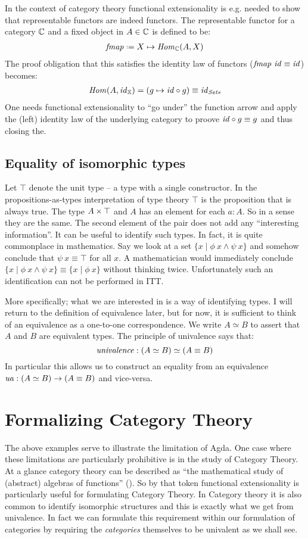 In the context of category theory functional extensionality is e.g. needed to
show that representable functors are indeed functors. The representable functor
for a category $\mathbb{C}$ and a fixed object in $A \in \mathbb{C}$ is defined to be:
%
\begin{align*}
\fmap \defeq X \mapsto \Hom_{\bC}(A, X)
\end{align*}
%
The proof obligation that this satisfies the identity law of functors
($\mathit{fmap}\ \mathit{id} \equiv \mathit{id}$) becomes:
%
\begin{align*}
\mathit{Hom}(A, \mathit{id}_{\mathbb{X}}) = (g \mapsto \mathit{id} \circ g) \equiv \mathit{id}_{\mathit{Sets}}
\end{align*}
%
One needs functional extensionality to ``go under'' the function arrow and apply
the (left) identity law of the underlying category to proove $\mathit{id} \circ g
\equiv g$ and thus closing the.
%
\subsection{Equality of isomorphic types}
%
Let $\top$ denote the unit type -- a type with a single constructor. In the
propositions-as-types interpretation of type theory $\top$ is the proposition
that is always true. The type $A \times \top$ and $A$ has an element for each $a :
A$. So in a sense they are the same. The second element of the pair does not add
any ``interesting information''. It can be useful to identify such types. In
fact, it is quite commonplace in mathematics. Say we look at a set $\{x \mid
\phi\ x \land \psi\ x\}$ and somehow conclude that $\psi\ x \equiv \top$ for all
$x$. A mathematician would immediately conclude $\{x \mid \phi\ x \land
\psi\ x\} \equiv \{x \mid \phi\ x\}$ without thinking twice. Unfortunately such
an identification can not be performed in ITT.

More specifically; what we are interested in is a way of identifying
 types. I will return to the definition of equivalence later,
but for now, it is sufficient to think of an equivalence as a one-to-one
correspondence. We write $A \simeq B$ to assert that $A$ and $B$ are equivalent
types. The principle of univalence says that:
%
$$\mathit{univalence} \;\mathord{:}\; (A \simeq B) \simeq (A \equiv B)$$
%
In particular this allows us to construct an equality from an equivalence $\mathit{ua} \;\mathord{:}\;
(A \simeq B) \to (A \equiv B)$ and vice-versa.
\section{Formalizing Category Theory}
%
The above examples serve to illustrate the limitation of Agda. One case where
these limitations are particularly prohibitive is in the study of Category
Theory. At a glance category theory can be described as ``the mathematical study
of (abstract) algebras of functions'' (\cite{awodey-2006}). So by that token
functional extensionality is particularly useful for formulating Category
Theory. In Category theory it is also common to identify isomorphic structures
and this is exactly what we get from univalence. In fact we can formulate this
requirement within our formulation of categories by requiring the
\emph{categories} themselves to be univalent as we shall see.

